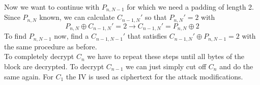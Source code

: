 Now we want to continue with $P_{n,N-1}$ for which we need a padding of length 2.
Since $P_{n,N}$ known, we can calculate $C_{n-1,N}'$ so that $P_{n,N}' = 2$ with
\begin{equation*}
  P_{n,N} \oplus C_{n-1,N}' = 2 \rightarrow C_{n-1,N}' = P_{n,N} \oplus 2
\end{equation*}
To find $P_{n,N-1}$ now, find a $C_{n-1,N-1}'$ that satisfies $C_{n-1,N}' \oplus P_{n,N-1} = 2$ with the same procedure as before.\\
To completely decrypt $C_n$ we have to repeat these steps until all bytes of the block are decrypted.
To decrypt $C_{n-1}$ we can just simply cut off $C_n$ and do the same again.
For $C_1$ the IV is used as ciphertext for the attack modifications.
